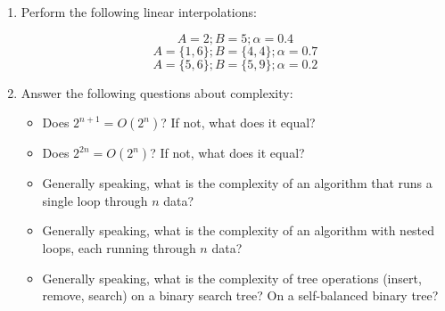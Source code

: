 \documentclass[a4paper,12pt]{article}
\begin{document}
\begin{enumerate}
\item Perform the following linear interpolations:

\vspace{-10pt}
$$A=2; B=5; \alpha=0.4$$
$$A=\{1,6\}; B=\{4,4\}; \alpha=0.7$$
$$A=\{5,6\}; B=\{5,9\}; \alpha=0.2$$



\item Answer the following questions about complexity:

\begin{itemize}
	\item Does $2^{n+1}=O(2^n)$? If not, what does it equal?
	\item Does $2^{2n}=O(2^n)$? If not, what does it equal?
	\item Generally speaking, what is the complexity of an algorithm that runs a single loop through $n$ data?
	\item Generally speaking, what is the complexity of an algorithm with nested loops, each running through $n$ data?
	\item Generally speaking, what is the complexity of tree operations (insert, remove, search) on a binary search tree? On a self-balanced binary tree?
\end{itemize}



\end{enumerate}
\end{document}
